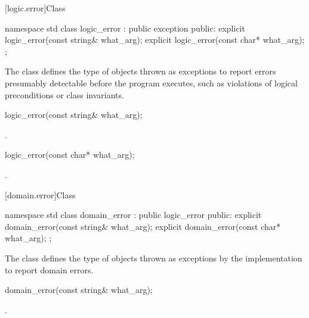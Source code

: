 [logic.error]{Class }

%
\begin{codeblock}
namespace std {
  class logic_error : public exception {
  public:
    explicit logic_error(const string& what_arg);
    explicit logic_error(const char* what_arg);
  };
}
\end{codeblock}

\pnum
The class
defines the type of objects thrown as
exceptions to report errors presumably detectable before
the program executes, such as violations of logical preconditions or class
invariants.

%
\begin{itemdecl}
logic_error(const string& what_arg);
\end{itemdecl}

\begin{itemdescr}
\pnum
\ensures
{}.
\end{itemdescr}

%
\begin{itemdecl}
logic_error(const char* what_arg);
\end{itemdecl}

\begin{itemdescr}
\pnum
\ensures
{}.
\end{itemdescr}

[domain.error]{Class }

%
\begin{codeblock}
namespace std {
  class domain_error : public logic_error {
  public:
    explicit domain_error(const string& what_arg);
    explicit domain_error(const char* what_arg);
  };
}
\end{codeblock}

\pnum
The class
defines the type of objects thrown as
exceptions by the implementation to report domain errors.

%
\begin{itemdecl}
domain_error(const string& what_arg);
\end{itemdecl}

\begin{itemdescr}
\pnum
\ensures
{}.
\end{itemdescr}

